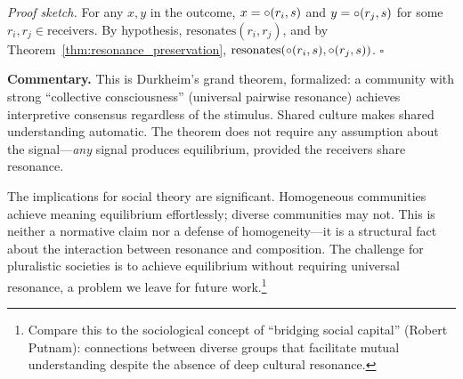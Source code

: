 \noindent\textit{Proof sketch.}\quad
For any $x, y$ in the outcome, $x = \circ(r_i, s)$ and
$y = \circ(r_j, s)$ for some $r_i, r_j \in \text{receivers}$.
By hypothesis, $\text{resonates}(r_i, r_j)$, and by
Theorem~\ref{thm:resonance_preservation},
$\text{resonates}(\circ(r_i, s), \circ(r_j, s))$.
\hfill$\square$

\medskip

\noindent\textbf{Commentary.}
This is Durkheim's grand theorem, formalized: a community with strong
``collective consciousness'' (universal pairwise resonance) achieves
interpretive consensus regardless of the stimulus.  Shared culture makes
shared understanding automatic.  The theorem does not require any
assumption about the signal---\emph{any} signal produces equilibrium,
provided the receivers share resonance.

The implications for social theory are significant.  Homogeneous communities
achieve meaning equilibrium effortlessly; diverse communities may not.
This is neither a normative claim nor a defense of homogeneity---it is a
structural fact about the interaction between resonance and composition.
The challenge for pluralistic societies is to achieve equilibrium without
requiring universal resonance, a problem we leave for future
work.\footnote{Compare this to the sociological concept of ``bridging
social capital'' (Robert Putnam): connections between diverse groups that
facilitate mutual understanding despite the absence of deep cultural
resonance.}

